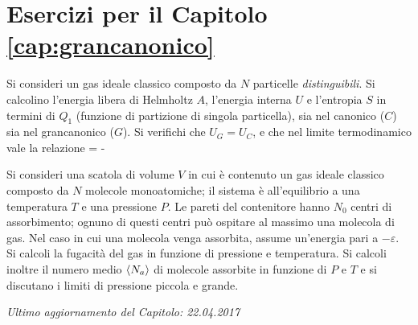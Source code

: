\section{Esercizi per il Capitolo \ref{cap:grancanonico}}

\begin{Exercise}[title={Equivalenza tra \ensembles},label={ex:05-eqcgc}]
\noindent
Si consideri un gas ideale classico composto da $N$ particelle {\em distinguibili}. Si calcolino l'energia libera di Helmholtz $A$, l'energia interna $U$ e l'entropia $S$ in termini di $Q_1$ (funzione di partizione di singola particella), sia nel canonico ($C$) sia nel grancanonico ($G$). Si verifichi che $U_G = U_C$, e che nel limite termodinamico vale la relazione
\be
{} = - \simeq {}
\ee
\end{Exercise}


\begin{Exercise}[title={Scatola a sorpresa},label={ex:05-sas}]
\noindent
Si consideri una scatola di volume $V$ in cui è contenuto un gas ideale classico composto da $N$ molecole monoatomiche; il sistema è all'equilibrio a una temperatura $T$ e una pressione $P$. Le pareti del contenitore hanno $N_0$ centri di assorbimento; ognuno di questi centri può ospitare al massimo una molecola di gas. Nel caso in cui una molecola venga assorbita, assume un'energia pari a $-\varepsilon$. Si calcoli la fugacità del gas in funzione di pressione e temperatura. Si calcoli inoltre il numero medio $\langle N_a\rangle$ di molecole assorbite in funzione di $P$ e $T$ e si discutano i limiti di pressione piccola e grande.
\end{Exercise}


\vskip 0.75cm
\begin{flushright}
{\em Ultimo aggiornamento del Capitolo: 22.04.2017}
\end{flushright}
